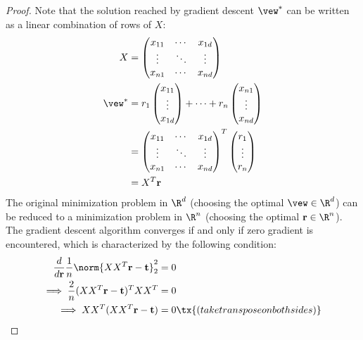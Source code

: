 \documentclass{article}
\begin{document}
	\subsubsection{}
	\begin{proof}
		Note that the solution reached by gradient descent $\vew^*$ can be written as a linear combination of rows of $X$:
		\begin{align}
			X &= \begin{pmatrix}
				x_{11} & \cdots & x_{1d} \\
				\vdots & \ddots & \vdots \\
				x_{n1} & \cdots & x_{nd}
			\end{pmatrix} \\
			\vew^* &= r_1
			\begin{pmatrix}
				x_{11} \\ \vdots \\ x_{1d}
			\end{pmatrix}
			+ \cdots + r_n
			\begin{pmatrix}
				x_{n1} \\ \vdots \\ x_{nd}
			\end{pmatrix} \\
			&= \begin{pmatrix}
				x_{11} & \cdots & x_{1d} \\
				\vdots & \ddots & \vdots \\
				x_{n1} & \cdots & x_{nd}
			\end{pmatrix}^T
			\begin{pmatrix}
				r_1 \\ \vdots \\ r_n
			\end{pmatrix} \\
			&= X^T \textbf{r}
		\end{align}
		The original minimization problem in $\R^d$ (choosing the optimal $\vew \in \R^d$) can be reduced to a minimization problem in $\R^n$ (choosing the optimal $\textbf{r} \in \R^n$). \\
		The gradient descent algorithm converges if and only if zero gradient is encountered, which is characterized by the following condition:
		\begin{align}
			\frac{d}{d\textbf{r}} \frac{1}{n} \norm{X X^T \textbf{r} - \textbf{t}}_2^2 &= 0 \\
			\implies \frac{2}{n} (XX^T \textbf{r} - \textbf{t})^T XX^T &= 0 \\
			\implies XX^T (XX^T \textbf{r} - \textbf{t}) &= 0 \tx{ (take transpose on both sides)} \\

\end{align}
\end{proof}
\end{document}
